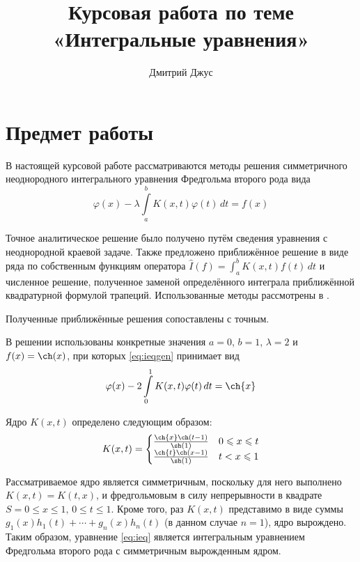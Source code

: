 \documentclass[11pt]{article}
\numberwithin{equation}{section}
\renewcommand{\phi}{\varphi}
\renewcommand{\leq}{\leqslant}
\newcommand{\intl}{\int\limits}
\begin{document}
\author{Дмитрий Джус}
\title{Курсовая работа по теме \\
  \Huge{«Интегральные уравнения»}}
\pretitle{\begin{center}\LARGE}
  \posttitle{\par\end{center}\vskip 3pc}
\date{}
\maketitle
\thispagestyle{empty}

\clearpage
\tableofcontents

\clearpage
\section{Предмет работы}
\label{sec:problem}
В настоящей курсовой работе рассматриваются методы решения
симметричного неоднородного интегрального уравнения Фредгольма второго
рода вида
\begin{equation}
  \label{eq:ieqgen}
  \phi(x) - \lambda \intl_a^b {K(x, t) \phi(t)\,dt} = f(x)
\end{equation}

Точное аналитическое решение было получено путём сведения уравнения с
неоднородной краевой задаче. Также предложено приближённое решение в
виде ряда по собственным функциям оператора $\hat{I}(f) =
\int_a^b{K(x, t) f(t)\, dt}$ и численное решение, полученное заменой
определённого интеграла приближённой квадратурной формулой трапеций.
Использованные методы рассмотрены в \cite{polyanin03}.

Полученные приближённые решения сопоставлены с точным.

В решении использованы конкретные значения $a=0$, $b=1$, $\lambda = 2$
и $f(x) = \ch(x)$, при которых \eqref{eq:ieqgen} принимает вид
\begin{equation}
  \label{eq:ieq}
  \phi(x) - 2 \intl_0^1 {K(x, t) \phi(t)\,dt} = \ch{x}
\end{equation}

Ядро $K(x,t)$ определено следующим образом:
\begin{equation}
  \label{eq:kernel}
  K(x, t) = 
  \begin{cases}
    \frac{\ch{x} \ch(t-1)}{\sh(1)} & 0 \leq x \leq t\\
    \frac{\ch{t} \ch(x-1)}{\sh(1)} & t < x \leq 1
  \end{cases}
\end{equation}

Рассматриваемое ядро является симметричным, поскольку для него
выполнено $K(x, t) = K(t, x)$, и фредгольмовым в силу непрерывности в
квадрате $S={0\leq x \leq 1,\, 0 \leq t \leq 1}$. Кроме того, раз
$K(x, t)$ представимо в виде суммы $g_1(x)h_1(t) + \dotsb + g_n(x)
h_n(t)$ (в данном случае $n=1$), ядро вырождено. Таким образом,
уравнение \eqref{eq:ieq} является интегральным уравнением Фредгольма
второго рода с симметричным вырожденным ядром.
\end{document}
